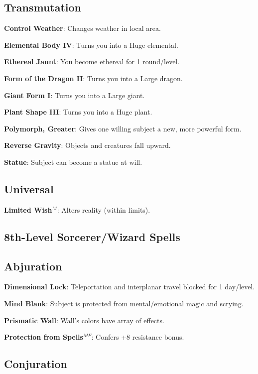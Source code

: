 \subsection{Transmutation}


\textbf{Control Weather}: Changes weather in local area.

\textbf{Elemental Body IV}: Turns you into a Huge elemental.

\textbf{Ethereal Jaunt}: You become ethereal for 1 round/level.

\textbf{Form of the Dragon II}: Turns you into a Large dragon.

\textbf{Giant Form I}: Turns you into a Large giant.

\textbf{Plant Shape III}: Turns you into a Huge plant.

\textbf{Polymorph, Greater}: Gives one willing subject a new, more powerful form.

\textbf{Reverse Gravity}: Objects and creatures fall upward.

\textbf{Statue}: Subject can become a statue at will.

\subsection{Universal}


\textbf{Limited Wish}\(^{M}\): Alters reality (within limits).

\subsection{8th-Level Sorcerer/Wizard Spells}


\subsection{Abjuration}


\textbf{Dimensional Lock}: Teleportation and interplanar travel blocked for 1 day/level.

\textbf{Mind Blank}: Subject is protected from mental/emotional magic and scrying.

\textbf{Prismatic Wall}: Wall's colors have array of effects.

\textbf{Protection from Spells}\(^{MF}\): Confers +8 resistance bonus.

\subsection{Conjuration}


